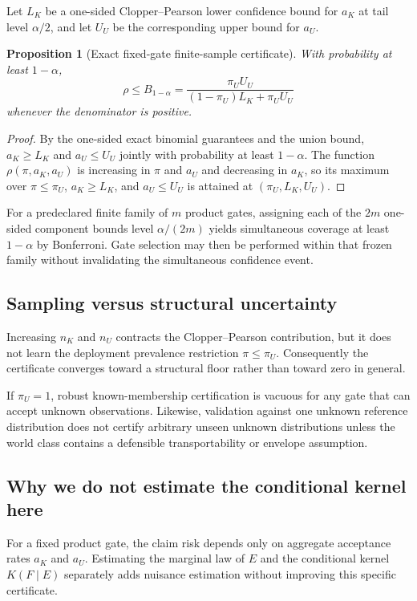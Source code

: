 \documentclass[11pt]{article}
\newtheorem{proposition}{Proposition}
\begin{document}
Let $L_K$ be a one-sided Clopper--Pearson lower confidence bound for $a_K$ at
tail level $\alpha/2$, and let $U_U$ be the corresponding upper bound for
$a_U$.

\begin{proposition}[Exact fixed-gate finite-sample certificate]
With probability at least $1-\alpha$,
\[
\boxed{
\rho
\le
B_{1-\alpha}
=
\frac{\pi_U U_U}
{(1-\pi_U)L_K+\pi_U U_U}
}
\]
whenever the denominator is positive.
\end{proposition}

\begin{proof}
By the one-sided exact binomial guarantees and the union bound,
$a_K\ge L_K$ and $a_U\le U_U$ jointly with probability at least
$1-\alpha$. The function $\rho(\pi,a_K,a_U)$ is increasing in
$\pi$ and $a_U$ and decreasing in $a_K$, so its maximum over
$\pi\le\pi_U$, $a_K\ge L_K$, and $a_U\le U_U$ is attained at
$(\pi_U,L_K,U_U)$.
\end{proof}

For a predeclared finite family of $m$ product gates, assigning each of the
$2m$ one-sided component bounds level $\alpha/(2m)$ yields simultaneous
coverage at least $1-\alpha$ by Bonferroni. Gate selection may then be
performed within that frozen family without invalidating the simultaneous
confidence event.

\subsection{Sampling versus structural uncertainty}

Increasing $n_K$ and $n_U$ contracts the Clopper--Pearson contribution, but it
does not learn the deployment prevalence restriction $\pi\le\pi_U$.
Consequently the certificate converges toward a structural floor rather than
toward zero in general.

If $\pi_U=1$, robust known-membership certification is vacuous for any gate
that can accept unknown observations. Likewise, validation against one
unknown reference distribution does not certify arbitrary unseen unknown
distributions unless the world class contains a defensible transportability or
envelope assumption.

\subsection{Why we do not estimate the conditional kernel here}

For a fixed product gate, the claim risk depends only on aggregate acceptance
rates $a_K$ and $a_U$. Estimating the marginal law of $E$ and the conditional
kernel $K(F\mid E)$ separately adds nuisance estimation without improving this
specific certificate.
\end{document}
